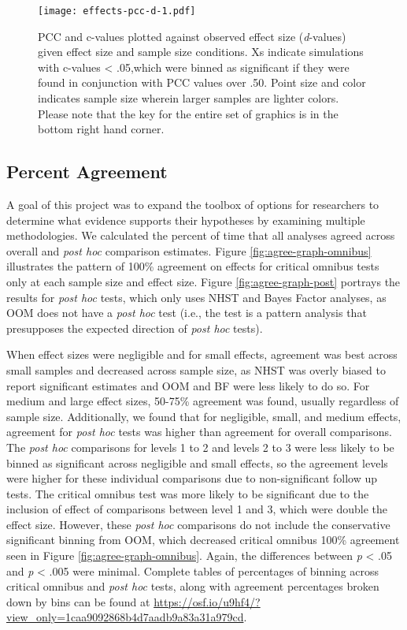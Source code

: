 \documentclass[,man, mask]{apa6}
\theoremstyle{definition}
\theoremstyle{definition}
\theoremstyle{definition}
\theoremstyle{remark}
\begin{document}
\begin{figure}
\centering
\texttt{[image: effects-pcc-d-1.pdf]}
\caption{\label{fig:effects-pcc-d}PCC and c-values plotted against observed
effect size (\emph{d}-values) given effect size and sample size
conditions. Xs indicate simulations with c-values \textless{} .05,which
were binned as significant if they were found in conjunction with PCC
values over .50. Point size and color indicates sample size wherein
larger samples are lighter colors. Please note that the key for the
entire set of graphics is in the bottom right hand corner.}
\end{figure}

\subsection{Percent Agreement}\label{percent-agreement}

A goal of this project was to expand the toolbox of options for
researchers to determine what evidence supports their hypotheses by
examining multiple methodologies. We calculated the percent of time that
all analyses agreed across overall and \emph{post hoc} comparison
estimates. Figure \ref{fig:agree-graph-omnibus} illustrates the pattern
of 100\% agreement on effects for critical omnibus tests only at each
sample size and effect size. Figure \ref{fig:agree-graph-post} portrays
the results for \emph{post hoc} tests, which only uses NHST and Bayes
Factor analyses, as OOM does not have a \emph{post hoc} test (i.e., the
test is a pattern analysis that presupposes the expected direction of
\emph{post hoc} tests).

When effect sizes were negligible and for small effects, agreement was
best across small samples and decreased across sample size, as NHST was
overly biased to report significant estimates and OOM and BF were less
likely to do so. For medium and large effect sizes, 50-75\% agreement
was found, usually regardless of sample size. Additionally, we found
that for negligible, small, and medium effects, agreement for \emph{post
hoc} tests was higher than agreement for overall comparisons. The
\emph{post hoc} comparisons for levels 1 to 2 and levels 2 to 3 were
less likely to be binned as significant across negligible and small
effects, so the agreement levels were higher for these individual
comparisons due to non-significant follow up tests. The critical omnibus
test was more likely to be significant due to the inclusion of effect of
comparisons between level 1 and 3, which were double the effect size.
However, these \emph{post hoc} comparisons do not include the
conservative significant binning from OOM, which decreased critical
omnibus 100\% agreement seen in Figure \ref{fig:agree-graph-omnibus}.
Again, the differences between \emph{p} \textless{} .05 and \emph{p}
\textless{} .005 were minimal. Complete tables of percentages of binning
across critical omnibus and \emph{post hoc} tests, along with agreement
percentages broken down by bins can be found at
\url{https://osf.io/u9hf4/?view_only=1caa9092868b4d7aadb9a83a31a979cd}.
\end{document}
